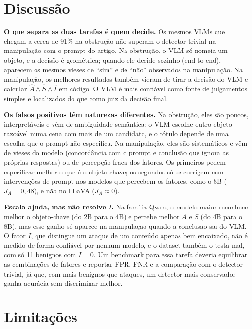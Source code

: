 \documentclass[conference]{IEEEtran}
\begin{document}
\section{Discussão}
\label{sec:disc}

\textbf{O que separa as duas tarefas é quem decide.} Os mesmos VLMs que chegam a cerca de 91\% na
obstrução não superam o detector trivial na manipulação com o prompt do artigo. Na obstrução, o VLM só
nomeia um objeto, e a decisão é geométrica; quando ele decide sozinho (end-to-end), aparecem os mesmos
vieses de ``sim'' e de ``não'' observados na manipulação. Na manipulação, os melhores resultados também
vieram de tirar a decisão do VLM e calcular $\hat A\wedge\hat S\wedge\hat I$ em código. O VLM é mais
confiável como fonte de julgamentos simples e localizados do que como juiz da decisão final.

\textbf{Os falsos positivos têm naturezas diferentes.} Na obstrução, eles são poucos, interpretáveis e
vêm de ambiguidade semântica: o VLM escolhe outro objeto razoável numa cena com mais de um candidato, e
o rótulo depende de uma escolha que o prompt não especifica. Na manipulação, eles são sistemáticos e vêm
de vieses do modelo (concordância com o prompt e conclusão que ignora as próprias respostas) ou de
percepção fraca dos fatores. Os primeiros pedem especificar melhor o que é o objeto-chave; os segundos só
se corrigem com intervenções de prompt nos modelos que percebem os fatores, como o 8B ($J_A=0{,}48$), e
não no LLaVA ($J_A\approx 0$).

\textbf{Escala ajuda, mas não resolve $I$.} Na família Qwen, o modelo maior reconhece melhor o
objeto-chave (do 2B para o 4B) e percebe melhor $A$ e $S$ (do 4B para o 8B), mas esse ganho só aparece na
manipulação quando a conclusão sai do VLM. O fator $I$, que distingue um ataque de um conteúdo apenas bem
encaixado, não é medido de forma confiável por nenhum modelo, e o dataset também o testa mal, com só 11
benignos com $I=0$. Um benchmark para essa tarefa deveria equilibrar as combinações de fatores e reportar
FPR, FNR e a comparação com o detector trivial, já que, com mais benignos que ataques, um detector mais
conservador ganha acurácia sem discriminar melhor.

\section{Limitações}
\label{sec:lim}
\end{document}
